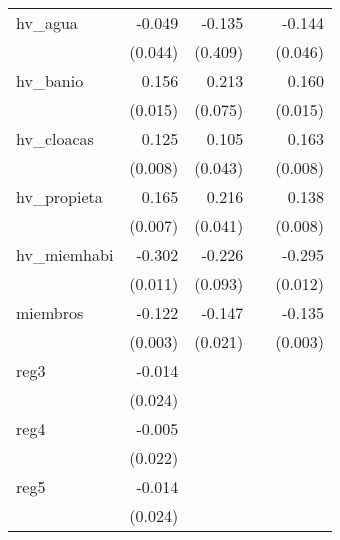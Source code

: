 {\begin{longtable}{l*{4}{D{.}{.}{-1}}}
\addlinespace
hv\_agua     &      -0.049         &      -0.135         &                     &      -0.144\sym{**} \\
            &     (0.044)         &     (0.409)         &                     &     (0.046)         \\
\addlinespace
hv\_banio    &       0.156\sym{***}&       0.213\sym{**} &                     &       0.160\sym{***}\\
            &     (0.015)         &     (0.075)         &                     &     (0.015)         \\
\addlinespace
hv\_cloacas  &       0.125\sym{***}&       0.105\sym{*}  &                     &       0.163\sym{***}\\
            &     (0.008)         &     (0.043)         &                     &     (0.008)         \\
\addlinespace
hv\_propieta &       0.165\sym{***}&       0.216\sym{***}&                     &       0.138\sym{***}\\
            &     (0.007)         &     (0.041)         &                     &     (0.008)         \\
\addlinespace
hv\_miemhabi &      -0.302\sym{***}&      -0.226\sym{*}  &                     &      -0.295\sym{***}\\
            &     (0.011)         &     (0.093)         &                     &     (0.012)         \\
\addlinespace
miembros    &      -0.122\sym{***}&      -0.147\sym{***}&                     &      -0.135\sym{***}\\
            &     (0.003)         &     (0.021)         &                     &     (0.003)         \\
\addlinespace
reg3        &      -0.014         &                     &                     &                     \\
            &     (0.024)         &                     &                     &                     \\
\addlinespace
reg4        &      -0.005         &                     &                     &                     \\
            &     (0.022)         &                     &                     &                     \\
\addlinespace
reg5        &      -0.014         &                     &                     &                     \\
            &     (0.024)         &                     &                     &                     \\

\end{longtable}}
